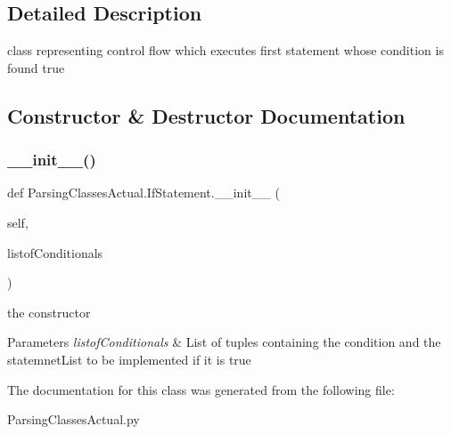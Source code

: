 \subsection{Detailed Description}
class representing control flow which executes first statement whose condition is found true 

\subsection{Constructor \& Destructor Documentation}
\mbox{\label{class_parsing_classes_actual_1_1_if_statement_adcb418725eec33d6e81784b67c1fe776}} 
\subsubsection{\texorpdfstring{\+\_\+\+\_\+init\+\_\+\+\_\+()}{\_\_init\_\_()}}
{\footnotesize\ttfamily def Parsing\+Classes\+Actual.\+If\+Statement.\+\_\+\+\_\+init\+\_\+\+\_\+ (\begin{DoxyParamCaption}\item[{}]{self,  }\item[{}]{listof\+Conditionals }\end{DoxyParamCaption})}



the constructor 


\begin{DoxyParams}{Parameters}
{\em listof\+Conditionals} & List of tuples containing the condition and the statemnet\+List to be implemented if it is true \\
\hline
\end{DoxyParams}


The documentation for this class was generated from the following file\+:\begin{DoxyCompactItemize}
\item 
Parsing\+Classes\+Actual.\+py\end{DoxyCompactItemize}
